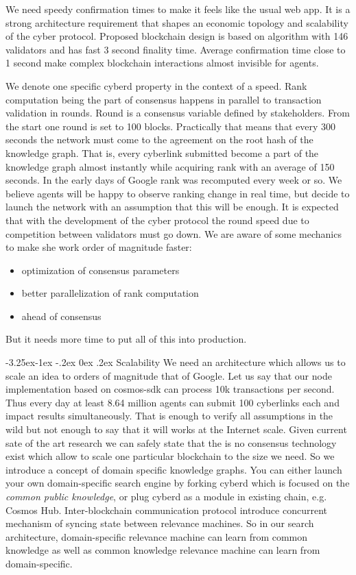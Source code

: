 \documentclass[8pt,oneside]{amsart}
\makeatletter
\newcommand{\linkred}[2]{\href{#1}{\color{red}{#2}}}
\newcommand{\linkgreen}[2]{\href{#1}{\color{green}{#2}}}
\renewcommand\subsection{\@startsection{subsection}{2}{\z@}%
                                     {-3.25ex\@plus -1ex \@minus -.2ex}%
                                     {0ex \@plus .2ex}%
                                     {\play\Large}}%
\newcommand{\titleSection}[1]{\subsection{#1}}
\newcommand{\code}[1]{{\PlayBold #1}}
\makeatother
\begin{document}
We need speedy confirmation times to make it feels like the usual web app. It is a strong architecture requirement that shapes an economic topology and scalability of the cyber protocol. Proposed blockchain design is based on \linkgreen{https://ipfs.io/ipfs/QmaMtD7xDgghqgjN62zWZ5TBGFiEjGQtuZBjJ9sMh816KJ}{Tendermint consensus} algorithm with 146 validators and has fast 3 second finality time. Average confirmation time close to 1 second make complex blockchain interactions almost invisible for agents.

We denote one specific cyberd property in the context of a speed. Rank computation being the part of consensus happens in parallel to transaction validation in rounds. Round is a consensus variable defined by stakeholders. From the start one round is set to 100 blocks. Practically that means that every 300 seconds the network must come to the agreement on the root hash of the knowledge graph. That is, every cyberlink submitted become a part of the knowledge graph almost instantly while acquiring rank with an average of 150 seconds. In the early days of Google rank was recomputed every week or so. We believe agents will be happy to observe ranking change in real time, but decide to launch the network with an assumption that this will be enough. It is expected that with the development of the cyber protocol the round speed due to competition between validators must go down. We are aware of some mechanics to make she work order of magnitude faster:
\begin{itemize}
\item optimization of consensus parameters
\item better parallelization of rank computation
\item \linkred{https://medium.com/solana-labs/proof-of-history-a-clock-for-blockchain-cf47a61a9274}{better clock} ahead of consensus
\end{itemize}

But it needs more time to put all of this into production.

\titleSection{Scalability}\label{scalability}
We need an architecture which allows us to scale an idea to orders of magnitude that of Google. Let us say that our node implementation based on \code{cosmos-sdk} can process 10k transactions per second. Thus every day at least 8.64 million agents can submit 100 cyberlinks each and impact results simultaneously. That is enough to verify all assumptions in the wild but not enough to say that it will works at the Internet scale. Given current sate of the art research we can safely state that the is no consensus technology exist which allow to scale one particular blockchain to the size we need. So we introduce a concept of domain specific knowledge graphs. You can either launch your own domain-specific search engine by forking cyberd which is focused on the \textit{common public knowledge}, or plug cyberd as a module in existing chain, e.g. Cosmos Hub. Inter-blockchain communication protocol introduce concurrent mechanism of syncing state between relevance machines. So in our search architecture, domain-specific relevance machine can learn from common knowledge as well as common knowledge relevance machine can learn from domain-specific.
\end{document}
